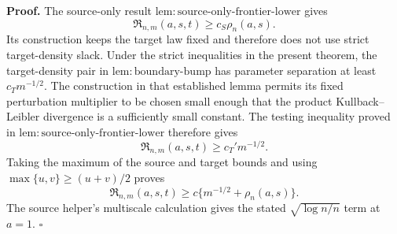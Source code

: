 \textbf{Proof.}
The source-only result \(\mathrm{lem:source\text{-}only\text{-}frontier\text{-}lower}\) gives
\[
\mathfrak R_{n,m}(a,s,t)\ge c_S\rho_n(a,s).
\]
Its construction keeps the target law fixed and therefore does not use strict target-density slack. Under the strict inequalities in the present theorem, the target-density pair in \(\mathrm{lem:boundary\text{-}bump}\) has parameter separation at least \(c_Tm^{-1/2}\). The construction in that established lemma permits its fixed perturbation multiplier to be chosen small enough that the product Kullback--Leibler divergence is a sufficiently small constant. The testing inequality proved in \(\mathrm{lem:source\text{-}only\text{-}frontier\text{-}lower}\) therefore gives
\[
\mathfrak R_{n,m}(a,s,t)\ge c_T'm^{-1/2}.
\]
Taking the maximum of the source and target bounds and using \(\max\{u,v\}\ge(u+v)/2\) proves
\[
\mathfrak R_{n,m}(a,s,t)\ge c\{m^{-1/2}+\rho_n(a,s)\}.
\]
The source helper's multiscale calculation gives the stated \(\sqrt{\log n/n}\) term at \(a=1\). \(\square\)